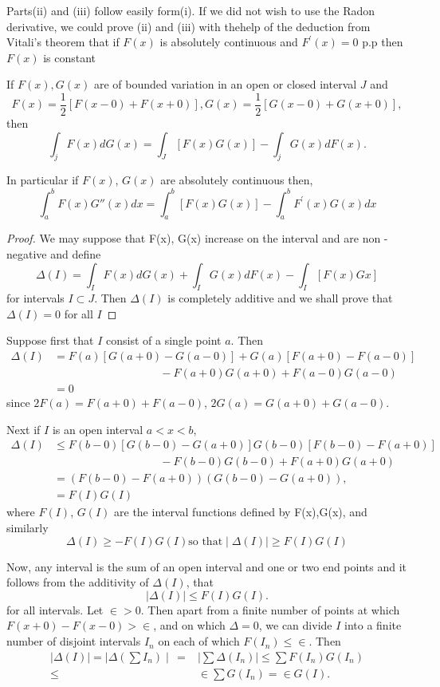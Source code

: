 Parts(ii) and (iii) follow easily form(i). If we did not wish to use
the Radon derivative, we could prove (ii) and (iii) with 
the\pageoriginale help of the deduction from Vitali's theorem that if $F(x)$ is
absolutely continuous and $F^{'}(x)=0$ p.p then $F(x)$
is constant 

\begin{theorem}\label{chap1:sec18:thm54}  
  If $F(x),G(x)$ are of bounded variation in an open or closed interval
  $J$ and  
  $$
  F(x)= \frac{1}{2} [ F(x-0)+F(x+0)], G(x)= \frac{1}{2} [G(x-0)+G(x+0)],
  $$
  then
  $$
  \int_j  F(x)dG (x)=\int_J [F(x) G(x)]-\int_j G(x)dF(x).
  $$
  
  In particular if $F(x)$, $G(x)$ are absolutely continuous then, 
  $$
  \int^b_a  F(x)G''(x)dx=\int^b_a[F(x)G(x)]-\int^b_a F^{'}(x)G(x)dx
  $$
\end{theorem}

\begin{proof}
  We may suppose that F(x), G(x) increase on the interval and are non -
  negative  and define 
  $$
  \Delta(I) =\int_I F(x)d G(x)+\int_I G(x)d F(x)- \int_I[F(x)G{x}]
  $$
  for intervals $I\subset J$. Then $\Delta (I)$ is completely additive
  and we shall prove that $\Delta (I)=0$ for all $I$ 
\end{proof}

Suppose first that $I$ consist of a single point $a$. Then
\begin{align*}
  \Delta
  (I)& = F(a)[G(a+0)-G(a-0)]+G(a) [F(a+0)-F(a-0)]\\
  & \hspace{4cm} -F(a+0)G(a+0)+F(a-0)G(a-0)\\
  &=0
\end{align*}
since $2F(a)=F(a+0)+F(a-0)$, $2G(a)=G(a+0)+G(a-0)$.

Next if $I$ is an open interval $a<x<b$,
\begin{align*}
  \Delta(I)& \leq F(b-0)[G(b-0)-G(a+0)]G(b-0) [F(b-0)-F(a+0)]\\
  & \hspace {4cm} -F(b-0) G(b-0)+ F(a+0) G(a+0)\\
  &=(F(b-0)-F(a+0)) (G(b-0)-G(a+0)),\\
  & = F(I)G(I)
\end{align*}\pageoriginale
where $F(I)$, $G(I)$ are the interval functions defined by F(x),G(x),
and similarly 
$$
\Delta (I) \ge -F(I)G(I) \text{so that} \mid \Delta
(I)\mid \ge F(I)G(I)
$$ 

Now, any interval is the sum of an open interval and one or two end
points and it follows from the additivity of $\Delta(I)$, that  
$$
\mid \Delta  (I)\mid \le F(I)G(I).
$$
for all intervals. Let $\in >0$. Then apart from a finite number of
points at which $F(x+0)-F(x-0) > \in$, and on which $\Delta =0$, we
can divide $I$ into a finite number of disjoint intervals $I_n$ on each
of which $F(I_n) \le \in.$ Then 
\begin{align*}
  \mid \Delta  (I)\mid=\mid \Delta \left(\sum I_n\right)\mid\, = &\mid
  \sum \Delta (I_n)\mid 
  \le \sum F(I_n)G(I_n)\\ 
  \le &\in \sum G(I_n)=\in G(I).
\end{align*}

